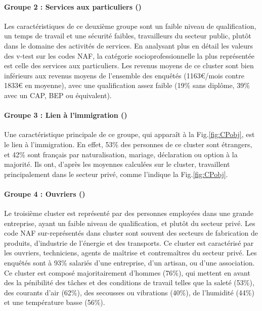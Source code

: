 \documentclass[11pt,fleqn,openany,frenchb]{book} %
\begin{document}
\paragraph{Groupe 2 : Services aux particuliers (\SERV)\\}
Les caractéristiques de ce deuxième groupe sont un faible niveau de qualification, un temps de travail et une sécurité faibles, travailleurs du secteur public, plutôt dans le domaine des activités de services. En analysant plus en détail les valeurs des v-test sur les codes NAF, la catégorie socioprofessionnelle la plus représentée est celle des services aux particuliers. Les revenus moyens de ce cluster sont bien inférieurs aux revenus moyens de l'ensemble des enquêtés (1163\euro{}/mois contre 1833\euro{} en moyenne), avec une qualification assez faible (19\% sans diplôme, 39\% avec un CAP, BEP ou équivalent).

\paragraph{Groupe 3 : Lien à l'immigration (\IMM)\\ }
Une caractéristique principale de ce groupe, qui apparaît à la Fig.\ref{fig:CPobj}, est le lien à l'immigration. En effet, 53\% des personnes de ce cluster sont étrangers, et 42\% sont français par naturalisation, mariage, déclaration ou option à la majorité. Ils ont, d'après les moyennes calculées sur le cluster, travaillent principalement dans le secteur privé, comme l'indique la Fig.\ref{fig:CPobj}.

\paragraph{Groupe 4 : Ouvriers (\OUVR)\\}
Le troisième cluster est représenté par des personnes employées dans une grande entreprise, ayant un faible niveau de qualification, et plutôt du secteur privé. Les code NAF sur-représentés dans cluster sont souvent des secteurs de fabrication de produits, d'industrie de l'énergie et des transports. Ce cluster est caractérisé par les ouvriers, techniciens, agents de maîtrise et contremaîtres du secteur privé. Les enquêtés sont à 93\% salariés d'une entreprise, d'un artisan, ou d'une association. Ce cluster est composé majoritairement d'hommes (76\%), qui mettent en avant des la pénibilité des tâches et des conditions de travail telles que la saleté (53\%), des courants d'air (62\%), des secousses ou vibrations (40\%), de l'humidité (44\%) et une température basse (56\%). 
\end{document}
